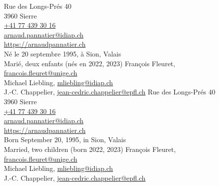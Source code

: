 \ifFrench

  \color{deepgray} \small
  Rue des Longs-Prés 40 \\
  3960 Sierre \\

  \href{tel:+41774393016}{+41 77 439 30 16} \\
  \href{mailto:arnaud.pannatier@idiap.ch}{arnaud.pannatier@idiap.ch} \\
  \href{https://arnaudpannatier.ch}{\url{https://arnaudpannatier.ch}}  \\
  \vspace{\baselineskip}
  Né le 20 septembre 1995, à Sion, Valais \\
  Marié, deux enfants (nés en 2022, 2023)
  \vfill
  \color{deepgray}
  François Fleuret, \href{mailto:francois.fleuret@unige.ch}{francois.fleuret@unige.ch} \\
  Michael Liebling, \href{mailto:mliebling@idiap.ch}{mliebling@idiap.ch} \\
  J.-C. Chappelier, \href{mailto:jean-cedric.chappelier@epfl.ch}{jean-cedric.chappelier@epfl.ch}
\else
  \color{deepgray} \small
  Rue des Longs-Prés 40 \\
  3960 Sierre \\
  \href{tel:+41774393016}{+41 77 439 30 16} \\
  \href{mailto:arnaud.pannatier@idiap.ch}{arnaud.pannatier@idiap.ch} \\
  \href{https://arnaudpannatier.ch}{\url{https://arnaudpannatier.ch}}  \\
  \vspace{\baselineskip}
  Born September 20, 1995, in Sion, Valais \\
  Married, two children (born 2022, 2023) 
  \vfill
  \color{deepgray}
  François Fleuret, \href{mailto:francois.fleuret@unige.ch}{francois.fleuret@unige.ch} \\
  Michael Liebling, \href{mailto:mliebling@idiap.ch}{mliebling@idiap.ch} \\
  J.-C. Chappelier, \href{mailto:jean-cedric.chappelier@epfl.ch}{jean-cedric.chappelier@epfl.ch}
  \fi